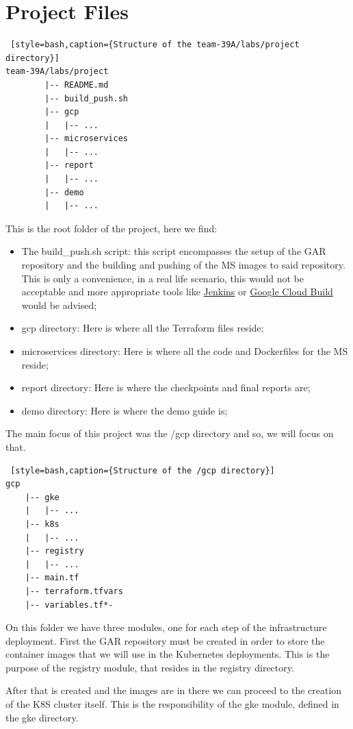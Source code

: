 \documentclass[12pt,a4paper,oneside]{report}
\begin{document}
\section{Project Files}
\begin{lstlisting} [style=bash,caption={Structure of the team-39A/labs/project directory}]
team-39A/labs/project
		|-- README.md
		|-- build_push.sh
		|-- gcp
		|   |-- ...
		|-- microservices
		|   |-- ...
		|-- report
		|   |-- ...
		|-- demo
		|   |-- ...
\end{lstlisting}

This is the root folder of the project, here we find:
\begin{itemize}
    \item The build\_push.sh script: this script encompasses the setup of the \ac{GAR} repository and the building and pushing of the \ac{MS} images to said repository. This is only a convenience, in a real life scenario, this would not be acceptable and more appropriate tools like \href{https://www.jenkins.io/}{Jenkins} or \href{https://cloud.google.com/build}{Google Cloud Build} would be advised;
    \item gcp directory: Here is where all the Terraform files reside;
    \item microservices directory: Here is where all the code and Dockerfiles for the \ac{MS} reside; 
    \item report directory: Here is where the checkpoints and final reports are;
    \item demo directory: Here is where the demo guide is;
\end{itemize}

The main focus of this project was the /gcp directory and so, we will focus on that.

\begin{lstlisting} [style=bash,caption={Structure of the /gcp directory}]
gcp
    |-- gke
    |   |-- ...
    |-- k8s
    |   |-- ...
    |-- registry
    |   |-- ...
    |-- main.tf
    |-- terraform.tfvars
    |-- variables.tf*-
\end{lstlisting}

On this folder we have three modules, one for each step of the infrastructure deployment.
First the \ac{GAR} repository must be created in order to store the container images that we will use in the Kubernetes deployments. This is the purpose of the registry module, that resides in the registry directory. 

After that is created and the images are in there we can proceed to the creation of the \ac{K8S} cluster itself. This is the responsibility of the gke module, defined in the gke directory.
\end{document}
